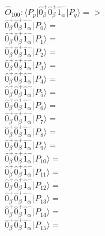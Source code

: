 \documentclass[14pt]{article}
\begin{document}
    $\hat{O}_{100}:  \langle{P_p}\vert \hat{0}_{\beta}^{+}\hat{0}_{\beta}^{+}\hat{1}_{\alpha}^{-} \vert{P_q}\rangle => $ \\ 
    $ \hat{0}_{\beta}^{+}\hat{0}_{\beta}^{+}\hat{1}_{\alpha}^{-} \vert{P_{0}}\rangle =  $ \\ 
    $ \hat{0}_{\beta}^{+}\hat{0}_{\beta}^{+}\hat{1}_{\alpha}^{-} \vert{P_{1}}\rangle =  $ \\ 
    $ \hat{0}_{\beta}^{+}\hat{0}_{\beta}^{+}\hat{1}_{\alpha}^{-} \vert{P_{2}}\rangle =  $ \\ 
    $ \hat{0}_{\beta}^{+}\hat{0}_{\beta}^{+}\hat{1}_{\alpha}^{-} \vert{P_{3}}\rangle =  $ \\ 
    $ \hat{0}_{\beta}^{+}\hat{0}_{\beta}^{+}\hat{1}_{\alpha}^{-} \vert{P_{4}}\rangle =  $ \\ 
    $ \hat{0}_{\beta}^{+}\hat{0}_{\beta}^{+}\hat{1}_{\alpha}^{-} \vert{P_{5}}\rangle =  $ \\ 
    $ \hat{0}_{\beta}^{+}\hat{0}_{\beta}^{+}\hat{1}_{\alpha}^{-} \vert{P_{6}}\rangle =  $ \\ 
    $ \hat{0}_{\beta}^{+}\hat{0}_{\beta}^{+}\hat{1}_{\alpha}^{-} \vert{P_{7}}\rangle =  $ \\ 
    $ \hat{0}_{\beta}^{+}\hat{0}_{\beta}^{+}\hat{1}_{\alpha}^{-} \vert{P_{8}}\rangle =  $ \\ 
    $ \hat{0}_{\beta}^{+}\hat{0}_{\beta}^{+}\hat{1}_{\alpha}^{-} \vert{P_{9}}\rangle =  $ \\ 
    $ \hat{0}_{\beta}^{+}\hat{0}_{\beta}^{+}\hat{1}_{\alpha}^{-} \vert{P_{10}}\rangle =  $ \\ 
    $ \hat{0}_{\beta}^{+}\hat{0}_{\beta}^{+}\hat{1}_{\alpha}^{-} \vert{P_{11}}\rangle =  $ \\ 
    $ \hat{0}_{\beta}^{+}\hat{0}_{\beta}^{+}\hat{1}_{\alpha}^{-} \vert{P_{12}}\rangle =  $ \\ 
    $ \hat{0}_{\beta}^{+}\hat{0}_{\beta}^{+}\hat{1}_{\alpha}^{-} \vert{P_{13}}\rangle =  $ \\ 
    $ \hat{0}_{\beta}^{+}\hat{0}_{\beta}^{+}\hat{1}_{\alpha}^{-} \vert{P_{14}}\rangle =  $ \\ 
    $ \hat{0}_{\beta}^{+}\hat{0}_{\beta}^{+}\hat{1}_{\alpha}^{-} \vert{P_{15}}\rangle =  $ \\ 
    
\end{document}
